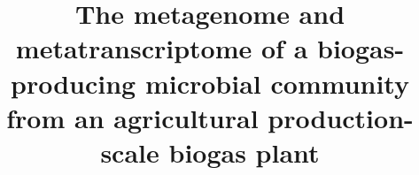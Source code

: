 \documentclass{bmcart}
\begin{document}
\begin{frontmatter}

\begin{fmbox}


\title{The metagenome and metatranscriptome of a biogas-producing microbial community from an agricultural production-scale biogas plant}


\author[
   addressref={cebitec,techfak},
   corref={cebitec},
   email={abremges@cebitec.uni-bielefeld.de}
]{ }
\author[
   addressref={cebitec}
]{ }
\author[
   addressref={techfak}
]{ }
\author[
   addressref={cebitec}
]{ }
\author[
   addressref={cebitec}
]{ }
\author[
   addressref={cebitec}
]{ }
\author[
   addressref={cebitec}
]{ }
\author[
   addressref={cebitec},
   noteref={n1}
]{ }
\author[
   addressref={cebitec,techfak},
   noteref={n1},
   email={asczyrba@cebitec.uni-bielefeld.de}
]{ }



\end{fmbox}
\end{frontmatter}
\end{document}
